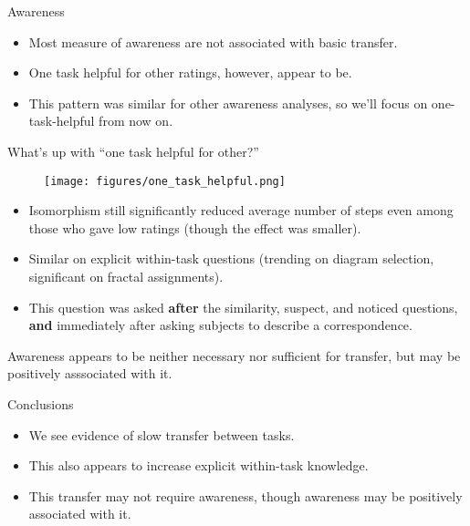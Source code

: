 \documentclass{beamer}
\begin{document}

\begin{frame}{Awareness}
\begin{itemize}
\item Most measure of awareness are not associated with basic transfer.
\item<2-> One task helpful for other ratings, however, appear to be.
\item<3-> This pattern was similar for other awareness analyses, so we'll focus on one-task-helpful from now on.
\end{itemize}
\end{frame}




\begin{frame}{What's up with ``one task helpful for other?''}
\begin{figure}
\centering
\texttt{[image: figures/one\_task\_helpful.png]}
\end{figure}
\vspace{-1em}
\begin{itemize}
\item<2-> Isomorphism still significantly reduced average number of steps even among those who gave low ratings (though the effect was smaller).
\item<3-> Similar on explicit within-task questions (trending on diagram selection, significant on fractal assignments). 
\item<4-> This question was asked \textbf{after} the similarity, suspect, and noticed questions, \textbf{and} immediately after asking subjects to describe a correspondence.
\end{itemize}
\end{frame}

\begin{frame}[standout]
Awareness appears to be neither necessary nor sufficient for transfer, but may be positively asssociated with it. 
\end{frame}


\begin{frame}{Conclusions}
\begin{itemize}
\item We see evidence of slow transfer between tasks.
\item<2-> This also appears to increase explicit within-task knowledge. 
\item<3-> This transfer may not require awareness, though awareness may be positively associated with it. 
\end{itemize}
\end{frame}
\end{document}
